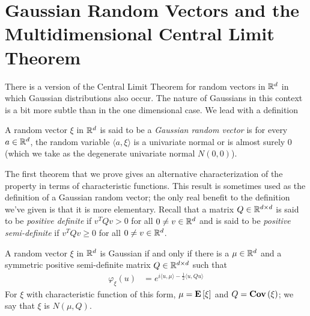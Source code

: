 \section{Gaussian Random Vectors and the Multidimensional Central
  Limit Theorem}
There is a version of the Central Limit Theorem for random vectors in
$\mathbb{R}^d$ in which Gaussian distributions also occur.  The nature of
Gaussians in this context is a bit more subtle than in the one
dimensional case.  We lead with a definition
\begin{defn}A random vector $\xi$ in $\mathbb{R}^d$ is said to be a \emph{Gaussian random
  vector} is for every $a \in \mathbb{R}^d$, the random variable $\langle
  a,\xi \rangle$ is a univariate normal or is almost surely 0 (which
  we take as the degenerate univariate normal $N(0,0)$).
\end{defn}
The first theorem that we prove gives an alternative characterization
of the property in terms of characteristic functions.  This result is
sometimes used as the definition of a Gaussian random vector; the only
real benefit to the definition we've given is that it is more
elementary.  Recall that a matrix $Q \in \mathbb{R}^{d \times d}$ is said
to be \emph{positive definite} if $v^T Q v > 0$ for all $0 \neq v \in
\mathbb{R}^d$ and is said to be \emph{positive semi-definite} if $v^T Q v
\geq 0$ for all $0 \neq v \in \mathbb{R}^d$.  
\begin{thm}\label{GaussianVectorCharacteristicFunction}A random vector
  $\xi$ in $\mathbb{R}^d$ is Gaussian if and only if there is a $\mu \in
  \mathbb{R}^d$ and a symmetric positive semi-definite matrix $Q \in
  \mathbb{R}^{d\times d}$ such that 
\begin{align*}
\varphi_\xi(u) &= e^{i\langle u, \mu\rangle - \frac{1}{2}\langle u, Qu
\rangle}
\end{align*}
For $\xi$ with characteristic function of this form, $\mu =
\textbf{E}\left[\xi\right]$ and $Q = \textbf{Cov} \left (\xi \right )$; we say that $\xi$ is
$N(\mu, Q)$.
\end{thm}
